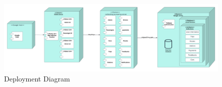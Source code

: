 \documentclass[a4paper, 12pt]{article} %
\begin{document}
        \begin{figure}
            \centering
            \includegraphics[width=\linewidth]{Images/deployment_diagram.png}
            \caption{Deployment Diagram}
            \label{fig:dep_diagram}
        \end{figure}
        
    \pagebreak
    
\end{document}
